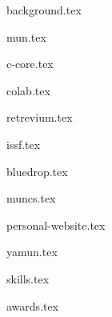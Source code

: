 \documentclass[11pt]{article}
\begin{document}
{background.tex}


{mun.tex}


{c-core.tex}

{colab.tex}

{retrevium.tex}

{issf.tex}

{bluedrop.tex}

{muncs.tex}


{personal-website.tex}

{yamun.tex}


{skills.tex}


{awards.tex}
\end{document}
